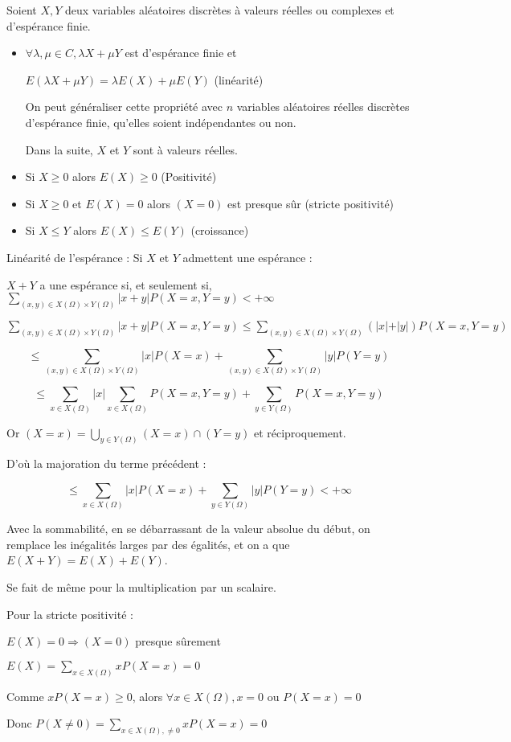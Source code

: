 \documentclass[a4paper,12pt]{book}
\newcommand{\Thr}[2]{\begin{tcolorbox}[sharp corners, colback=white,colframe=red!90!black!75, title=Théorème : #1]#2\end{tcolorbox}}
\newcommand{\Pre}[1]{\begin{tcolorbox}[sharp corners, colback=white,colframe=green!60!green!30!black!75, title=Preuve]#1\end{tcolorbox}}
\begin{document}
\Thr{Propriétés de l'espérance}{Soient $X,Y$ deux variables aléatoires discrètes à valeurs réelles ou complexes et d'espérance finie.\begin{itemize}
\item $\forall \lambda, \mu\in C, \lambda X+\mu Y$ est d'espérance finie et \par\begin{center}$E(\lambda X+\mu Y)=\lambda E(X)+\mu E(Y)$ (linéarité)\end{center} \par On peut généraliser cette propriété avec $n$ variables aléatoires réelles discrètes d'espérance finie, qu'elles soient indépendantes ou non.
\par Dans la suite, $X$ et $Y$ sont à valeurs réelles.
\item Si $X\geq 0$ alors $E(X)\geq 0$ (Positivité)
\item Si $X\geq 0$ et $E(X)=0$ alors $(X=0)$ est presque sûr (stricte positivité)
\item Si $X\leq Y$ alors $E(X)\leq E(Y)$ (croissance)
\end{itemize}}
\Pre{Linéarité de l'espérance : Si $X$ et $Y$ admettent une espérance :
\par $X+Y$ a une espérance si, et seulement si, $\sum\limits_{(x,y)\in X(\Omega)\times Y(\Omega)}\vert x+y\vert P(X=x, Y=y)<+\infty$
\par $\sum\limits_{(x,y)\in X(\Omega)\times Y(\Omega)} \vert x+y\vert P(X=x, Y=y) \leq \sum\limits_{(x,y)\in X(\Omega)\times Y(\Omega)}(\vert x\vert + \vert y\vert)P(X=x, Y=y)$
\par $$\leq \sum\limits_{(x,y)\in X(\Omega)\times Y(\Omega)}\vert x\vert P(X=x) + \sum\limits_{(x,y)\in X(\Omega)\times Y(\Omega)}\vert y\vert P(Y=y)$$
\par $$\leq \sum\limits_{x\in X(\Omega)}\vert x\vert\sum\limits_{x\in X(\Omega)}P(X=x, Y=y) + \sum\limits_{y\in Y(\Omega)}P(X=x, Y=y)$$
\par Or $(X=x) = \bigcup_{y\in Y(\Omega)} (X=x)\cap (Y=y)$ et réciproquement.
\par D'où la majoration du terme précédent :
\par $$\leq \sum_{x\in X(\Omega)}\vert x\vert P(X=x)+\sum\limits_{y\in Y(\Omega)}\vert y\vert P(Y=y) < + \infty$$
\par Avec la sommabilité, en se débarrassant de la valeur absolue du début, on remplace les inégalités larges par des égalités, et on a que $E(X+Y)=E(X)+E(Y)$.
\par Se fait de même pour la multiplication par un scalaire.
\par Pour la stricte positivité :
\par $E(X)=0\Rightarrow (X=0)$ presque sûrement
\par $E(X) = \sum\limits_{x\in X(\Omega)}xP(X=x) = 0$
\par Comme $xP(X=x)\geq 0$, alors $\forall x\in X(\Omega), x=0$ ou $P(X=x)=0$
\par Donc $P(X\neq 0) = \sum\limits_{x\in X(\Omega), \neq 0}xP(X=x)=0$
}
\end{document}
